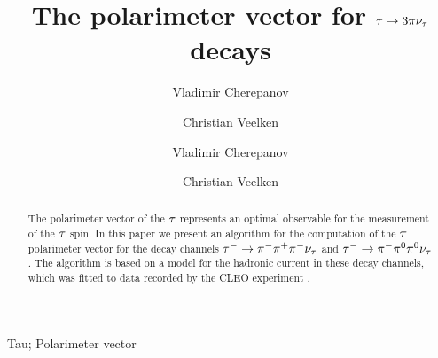 \ifx\ver\verPAPER
\begin{frontmatter}
\fi

\title{The polarimeter vector for $\tau \to 3 \pi\nu_{\tau}$ decays}
\ifx\ver\verPreprint
\author[1]{Vladimir Cherepanov}
\author[2]{Christian Veelken}
\fi
\ifx\ver\verPAPER
\author[a]{Vladimir Cherepanov}
\author[b]{Christian Veelken}
\address[a]{University of Florida, Department of Physics,  Gainesville, FL, 32611 - 8440, USA }
\address[b]{National Institute of Chemical Physics and Biophysics (NICPB), R\"{a}vala pst 10, 10143 Tallinn, Estonia}
\fi

\ifx\ver\verPreprint
\maketitle
\fi

\begin{abstract}
The polarimeter vector of the $\tau$ represents an optimal observable for the measurement of the $\tau$ spin. 
In this paper we present an algorithm for the computation of the $\tau$ polarimeter vector for the decay channels $\tau^{-} \to \pi^{-}\pi^{+}\pi^{-}\nu_{\tau}$ and $\tau^{-} \to \pi^{-}\pi^{\textrm{0}}\pi^{\textrm{0}}\nu_{\tau}$.
The algorithm is based on a model for the hadronic current in these decay channels, which was fitted to data recorded by the CLEO experiment
\cite{CLEO:1999rzk}.
\end{abstract}

\ifx\ver\verPAPER
\begin{keyword}
Tau; Polarimeter vector
\end{keyword}
\end{frontmatter}
\fi


